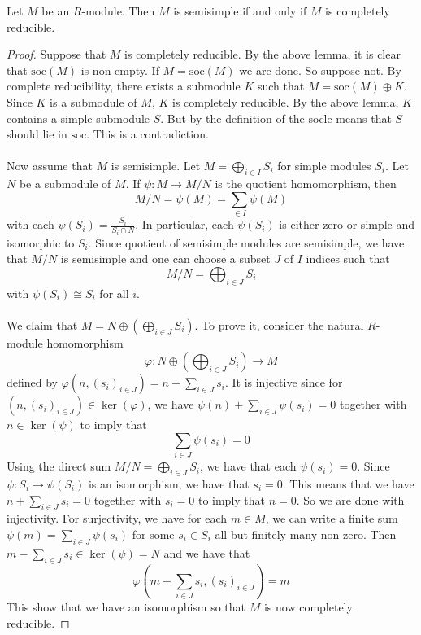\documentclass[a4paper]{article}
\begin{document}
\begin{thm}{}{} Let $M$ be an $R$-module. Then $M$ is semisimple if and only if $M$ is completely reducible. \tcbline
\begin{proof}
Suppose that $M$ is completely reducible. By the above lemma, it is clear that $\text{soc}(M)$ is non-empty. If $M=\text{soc}(M)$ we are done. So suppose not. By complete reducibility, there exists a submodule $K$ such that $M=\text{soc}(M)\oplus K$. Since $K$ is a submodule of $M$, $K$ is completely reducible. By the above lemma, $K$ contains a simple submodule $S$. But by the definition of the socle means that $S$ should lie in $\text{soc}$. This is a contradiction. \\~\\

Now assume that $M$ is semisimple. Let $M=\bigoplus_{i\in I}S_i$ for simple modules $S_i$. Let $N$ be a submodule of $M$. If $\psi:M\to M/N$ is the quotient homomorphism, then $$M/N=\psi(M)=\sum_{\in I}\psi(M)$$ with each $\psi(S_i)=\frac{S_i}{S_i\cap N}$. In particular, each $\psi(S_i)$ is either zero or simple and isomorphic to $S_i$. Since quotient of semisimple modules are semisimple, we have that $M/N$ is semisimple and one can choose a subset $J$ of $I$ indices such that $$M/N=\bigoplus_{i\in J} S_i$$ with $\psi(S_i)\cong S_i$ for all $i$. \\~\\

We claim that $M=N\oplus\left(\bigoplus_{i\in J}S_i\right)$. To prove it, consider the natural $R$-module homomorphism $$\varphi:N\oplus\left(\bigoplus_{i\in J}S_i\right)\to M$$ defined by $\varphi(n,(s_i)_{i\in J})=n+\sum_{i\in J}s_i$. It is injective since for $(n,(s_i)_{i\in J})\in\ker(\varphi)$, we have $\psi(n)+\sum_{i\in J}\psi(s_i)=0$ together with $n\in\ker(\psi)$ to imply that $$\sum_{i\in J}\psi(s_i)=0$$ Using the direct sum $M/N=\bigoplus_{i\in J} S_i$, we have that each $\psi(s_i)=0$. Since $\psi:S_i\to\psi(S_i)$ is an isomorphism, we have that $s_i=0$. This means that we have $n+\sum_{i\in J}s_i=0$ together with $s_i=0$ to imply that $n=0$. So we are done with injectivity. For surjectivity, we have for each $m\in M$, we can write a finite sum $\psi(m)=\sum_{i\in J}\psi(s_i)$ for some $s_i\in S_i$ all but finitely many non-zero. Then $m-\sum_{i\in J}s_i\in\ker(\psi)=N$ and we have that $$\varphi\left(m-\sum_{i\in J}s_i,(s_i)_{i\in J}\right)=m$$ This show that we have an isomorphism so that $M$ is now completely reducible. 
\end{proof}
\end{thm}
\end{document}
